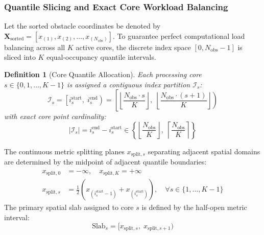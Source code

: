 \documentclass[journal,compsoc]{IEEEtran}
\newtheorem{definition}{Definition}
\begin{document}
\subsubsection{Quantile Slicing and Exact Core Workload Balancing}
Let the sorted obstacle coordinates be denoted by $\mathbf{X}_{\text{sorted}} = [x_{(1)}, x_{(2)}, \dots, x_{(N_{\text{obs}})}]$. To guarantee perfect computational load balancing across all $K$ active cores, the discrete index space $[0, N_{\text{obs}}-1]$ is sliced into $K$ equal-occupancy quantile intervals.
\begin{definition}[Core Quantile Allocation]
Each processing core $s \in \{0, 1, \dots, K-1\}$ is assigned a contiguous index partition $\mathcal{I}_s$:
\begin{equation}
\mathcal{I}_s = \left[ i_s^{\text{start}}, \; i_s^{\text{end}} \right) = \left[ \left\lfloor \frac{N_{\text{obs}} \cdot s}{K} \right\rfloor, \; \left\lfloor \frac{N_{\text{obs}} \cdot (s + 1)}{K} \right\rfloor \right)
\label{eq:core_index_slice}
\end{equation}
with exact core point cardinality:
\begin{equation}
|\mathcal{I}_s| = i_s^{\text{end}} - i_s^{\text{start}} \in \left\{ \left\lfloor \frac{N_{\text{obs}}}{K} \right\rfloor, \; \left\lceil \frac{N_{\text{obs}}}{K} \right\rceil \right\}
\end{equation}
\end{definition}
The continuous metric splitting planes $x_{\text{split}, s}$ separating adjacent spatial domains are determined by the midpoint of adjacent quantile boundaries:
\begin{align}
x_{\text{split}, 0} &= -\infty, \quad x_{\text{split}, K} = +\infty \\
x_{\text{split}, s} &= \frac{1}{2} \left( x_{(i_s^{\text{start}} - 1)} + x_{(i_s^{\text{start}})} \right), \quad \forall s \in \{1, \dots, K-1\}
\label{eq:split_planes}
\end{align}
The primary spatial slab assigned to core $s$ is defined by the half-open metric interval:
\begin{equation}
\text{Slab}_s = \Big[ x_{\text{split}, s}, \; x_{\text{split}, s+1} \Big)
\end{equation}
\end{document}
